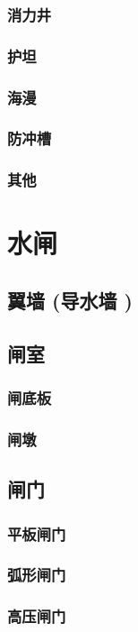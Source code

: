 \documentclass[UTF8]{../../ApplicationUniverse}
\begin{document}
        \subsubsection{消力井}
        \subsubsection{护坦}
        \subsubsection{海漫}
        \subsubsection{防冲槽}
        \subsubsection{其他}
\section{水闸}
    \subsection{翼墙 (导水墙 )}
    \subsection{闸室}
        \subsubsection{闸底板}
        \subsubsection{闸墩}
    \subsection{闸门}
        \subsubsection{平板闸门}
        \subsubsection{弧形闸门}
        \subsubsection{高压闸门}
\end{document}
